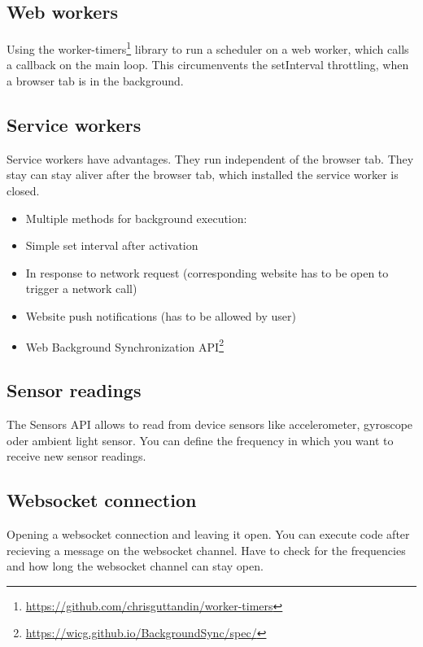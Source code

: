 \documentclass[article,type=bsc,colorback,accentcolor=tud9c]{tudthesis}
\begin{document}
  \subsection{Web workers}
  
  Using the worker-timers\footnote{\url{https://github.com/chrisguttandin/worker-timers}} library to run a scheduler on a web worker, which calls a callback on the main loop. This circumenvents the setInterval throttling, when a browser tab is in the background.

  \subsection{Service workers}

  Service workers have advantages. They run independent of the browser tab. They stay can stay aliver after the browser tab, which installed the service worker is closed.

  \begin{itemize}   
  \item Multiple methods for background execution:

  \item Simple set interval after activation

  \item In response to network request (corresponding website has to be open to trigger a network call)

  \item Website push notifications (has to be allowed by user)

  \item Web Background Synchronization API\footnote{\url{https://wicg.github.io/BackgroundSync/spec/}}
  \end{itemize}
  
  \subsection{Sensor readings}

  The Sensors API allows to read from device sensors like accelerometer, gyroscope oder ambient light sensor. You can define the frequency in which you want to receive new sensor readings.

  \subsection{Websocket connection}

  Opening a websocket connection and leaving it open. You can execute code after recieving a message on the websocket channel. Have to check for the frequencies and how long the websocket channel can stay open.
  
\end{document}

